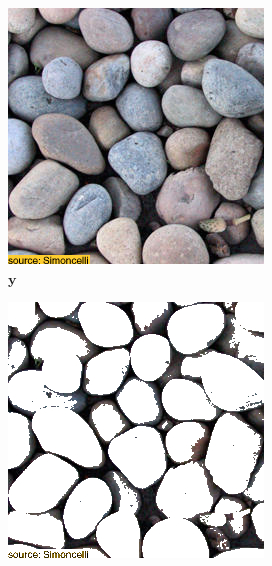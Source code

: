 \begin{figure}[]
\begin{subfigure}{\textwidth}
        \begin{subfigure}{0.24\textwidth}
            \centering
            \includegraphics[width=\textwidth]{images/04-experiment01/pebbles/target.jpg}
            \caption{\(\bm{y}\)}
            \label{fig:ex01-pebbles-1000steps-threshold_target}
        \end{subfigure}
        \hfill
        \begin{subfigure}{0.24\textwidth}
            \centering
            \includegraphics[width=\textwidth]{images/04-experiment01/pebbles/threshold_bg.jpg}

\end{subfigure}
\end{subfigure}
\end{figure}
